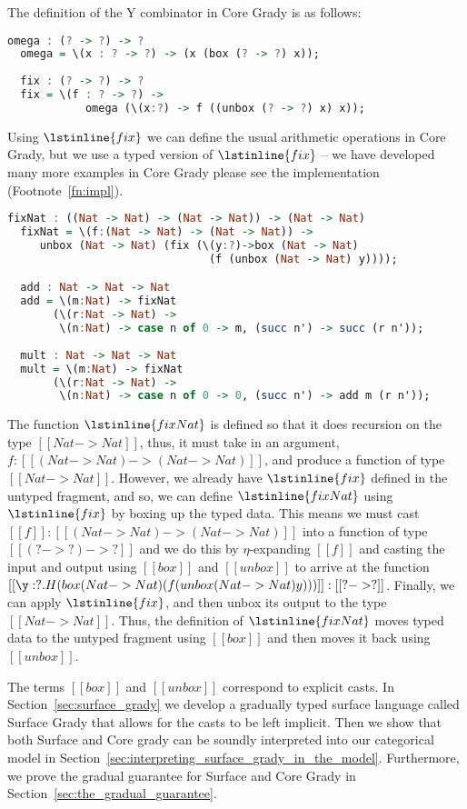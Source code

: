 The definition of the Y combinator in Core Grady is as follows:
\begin{lstlisting}[language=Haskell]
  omega : (? -> ?) -> ?
  omega = \(x : ? -> ?) -> (x (box (? -> ?) x));
  
  fix : (? -> ?) -> ?
  fix = \(f : ? -> ?) ->
            omega (\(x:?) -> f ((unbox (? -> ?) x) x));
\end{lstlisting}
Using $\lstinline{fix}$ we can define the usual arithmetic operations
in Core Grady, but we use a typed version of $\lstinline{fix}$ -- we
have developed many more examples in Core Grady please see the
implementation (Footnote~\ref{fn:impl}).
\begin{lstlisting}[language=Haskell]
  fixNat : ((Nat -> Nat) -> (Nat -> Nat)) -> (Nat -> Nat)
  fixNat = \(f:(Nat -> Nat) -> (Nat -> Nat)) ->
     unbox (Nat -> Nat) (fix (\(y:?)->box (Nat -> Nat) 
                               (f (unbox (Nat -> Nat) y))));

  add : Nat -> Nat -> Nat
  add = \(m:Nat) -> fixNat
       (\(r:Nat -> Nat) ->
        \(n:Nat) -> case n of 0 -> m, (succ n') -> succ (r n'));
        
  mult : Nat -> Nat -> Nat
  mult = \(m:Nat) -> fixNat
       (\(r:Nat -> Nat) ->
        \(n:Nat) -> case n of 0 -> 0, (succ n') -> add m (r n'));
\end{lstlisting}
The function $\lstinline{fixNat}$ is defined so that it does recursion
on the type $[[Nat -> Nat]]$, thus, it must take in an argument,
$f : [[(Nat -> Nat) -> (Nat -> Nat)]]$, and
produce a function of type $[[Nat -> Nat]]$.  However, we
already have $\lstinline{fix}$ defined in the untyped fragment, and
so, we can define $\lstinline{fixNat}$ using $\lstinline{fix}$ by
boxing up the typed data.  This means we must cast $[[f]] : [[(Nat -> Nat) -> (Nat -> Nat)]]$ into a function of type
$[[(? -> ?) -> ?]]$ and we do this by $\eta$-expanding
$[[f]]$ and casting the input and output using $[[box]]$ and
$[[unbox]]$ to arrive at the function
$[[\y:?.H(box (Nat -> Nat) (f (unbox (Nat -> Nat) y)))]] : [[? -> ?]]$.  Finally, we can apply $\lstinline{fix}$, and then unbox its output to the type $[[Nat -> Nat]]$.
Thus, the definition of $\lstinline{fixNat}$ moves typed data to the
untyped fragment using $[[box]]$ and then moves it back using
$[[unbox]]$.

The terms $[[box]]$ and $[[unbox]]$ correspond to explicit casts.  In
Section~\ref{sec:surface_grady} we develop a gradually typed surface
language called Surface Grady that allows for the casts to be left
implicit.  Then we show that both Surface and Core grady can be
soundly interpreted into our categorical model in
Section~\ref{sec:interpreting_surface_grady_in_the_model}.
Furthermore, we prove the gradual guarantee for Surface and Core Grady
in Section~\ref{sec:the_gradual_guarantee}.

